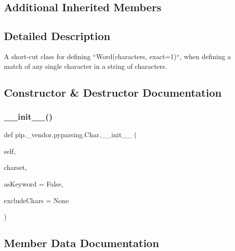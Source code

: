 \subsection*{Additional Inherited Members}


\subsection{Detailed Description}
\begin{DoxyVerb}A short-cut class for defining ``Word(characters, exact=1)``,
when defining a match of any single character in a string of
characters.
\end{DoxyVerb}
 

\subsection{Constructor \& Destructor Documentation}
\mbox{\label{classpip_1_1__vendor_1_1pyparsing_1_1Char_a1c980c03a977b0e38935ddb65ec73771}} 
\subsubsection{\texorpdfstring{\+\_\+\+\_\+init\+\_\+\+\_\+()}{\_\_init\_\_()}}
{\footnotesize\ttfamily def pip.\+\_\+vendor.\+pyparsing.\+Char.\+\_\+\+\_\+init\+\_\+\+\_\+ (\begin{DoxyParamCaption}\item[{}]{self,  }\item[{}]{charset,  }\item[{}]{as\+Keyword = {\ttfamily False},  }\item[{}]{exclude\+Chars = {\ttfamily None} }\end{DoxyParamCaption})}



\subsection{Member Data Documentation}
\mbox{\label{classpip_1_1__vendor_1_1pyparsing_1_1Char_ae1a8f12478b40001051ddee934dd39a6}} 
